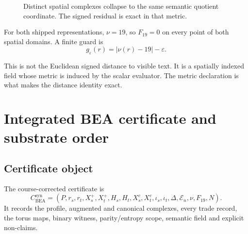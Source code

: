 \documentclass[10pt,a4paper]{article}
\newcommand{\code}[1]{\texttt{#1}}
\begin{document}
\begin{figure}[H]
\centering
{}
\caption{Distinct spatial complexes collapse to the same semantic quotient coordinate. The signed residual is exact in that metric.}
\end{figure}

For both shipped representations, $\nu=19$, so $F_{19}=0$ on every point of both spatial domains. A finite guard is
\[
g_\varepsilon(r)=|\nu(r)-19|-\varepsilon.
\]

\begin{boundbox}
This is not the Euclidean signed distance to visible text. It is a spatially indexed field whose metric is induced by the scalar evaluator. The metric declaration is what makes the distance identity exact.
\end{boundbox}

\section{Integrated BEA certificate and substrate order}

\subsection{Certificate object}
The course-corrected certificate is
\[
C_{\mathrm{BEA}}^{\mathrm{syn}}=(P,r_s,r_t,X_s^+,X_t^+,H_s,H_t,X_s^c,X_t^c,
\iota_s,\iota_t,\Delta,\mathcal E_n,\nu,F_{19},N).
\]
It records the profile, augmented and canonical complexes, every trade record, the torus maps, binary witness, parity/entropy scope, semantic field and explicit non-claims.
\end{document}
